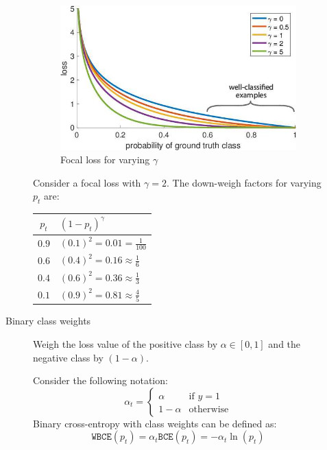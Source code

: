 \begin{description}
\begin{description}
                \begin{figure}[H]
                    \centering
                    \includegraphics[width=0.45\linewidth]{./img/_focal_loss.jpg}
                    \caption{Focal loss for varying $\gamma$}
                \end{figure}

                \begin{example}
                    Consider a focal loss with $\gamma = 2$. The down-weigh factors for varying $p_t$ are:
                    \begin{table}[H]
                        \centering
                        \footnotesize
                        \begin{tabular}{cl}
                            \toprule
                            $p_t$ & $(1-p_t)^\gamma$ \\
                            \midrule
                            $0.9$ & $(0.1)^2 = 0.01 = \frac{1}{100}$ \\ 
                            $0.6$ & $(0.4)^2 = 0.16 \approx \frac{1}{6}$ \\ 
                            $0.4$ & $(0.6)^2 = 0.36 \approx \frac{1}{3}$ \\ 
                            $0.1$ & $(0.9)^2 = 0.81 \approx \frac{4}{5}$ \\ 
                            \bottomrule
                        \end{tabular}
                    \end{table}
                \end{example}

            \item[Binary class weights] 
                Weigh the loss value of the positive class by $\alpha \in [0, 1]$ and the negative class by $(1 - \alpha)$.

                Consider the following notation:
                \[ \alpha_t = \begin{cases}
                    \alpha & \text{if $y=1$} \\
                    1-\alpha & \text{otherwise}
                \end{cases} \]
                Binary cross-entropy with class weights can be defined as:
                \[ \texttt{WBCE}(p_t) = \alpha_t \texttt{BCE}(p_t) = -\alpha_t \ln(p_t) \]


\end{description}
\end{description}
